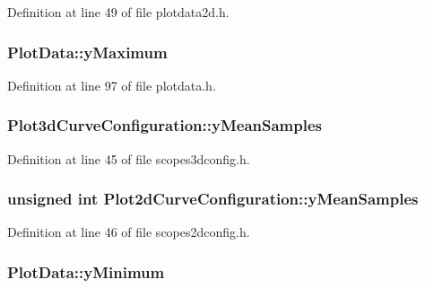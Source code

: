 Definition at line 49 of file plotdata2d.\-h.

\hypertarget{group___scope_plugin_gaf9ae404a5b9a749189b4cba112eb5c18}{
\subsubsection[{y\-Maximum}]{ Plot\-Data\-::y\-Maximum\hspace{0.3cm}{\ttfamily [protected]}}}\label{group___scope_plugin_gaf9ae404a5b9a749189b4cba112eb5c18}


Definition at line 97 of file plotdata.\-h.

\hypertarget{group___scope_plugin_ga917daaa3cc944ff8bd9e8ae6ed1cfc3b}{
\subsubsection[{y\-Mean\-Samples}]{ Plot3d\-Curve\-Configuration\-::y\-Mean\-Samples}}\label{group___scope_plugin_ga917daaa3cc944ff8bd9e8ae6ed1cfc3b}


Definition at line 45 of file scopes3dconfig.\-h.

\hypertarget{group___scope_plugin_gabe6fab440d33b0a9cb4ad4db2950c26d}{
\subsubsection[{y\-Mean\-Samples}]{\setlength{\rightskip}{0pt plus 5cm}unsigned {\bf int} Plot2d\-Curve\-Configuration\-::y\-Mean\-Samples}}\label{group___scope_plugin_gabe6fab440d33b0a9cb4ad4db2950c26d}


Definition at line 46 of file scopes2dconfig.\-h.

\hypertarget{group___scope_plugin_gabb9422e4f6ced646443b98b6b4304957}{
\subsubsection[{y\-Minimum}]{ Plot\-Data\-::y\-Minimum\hspace{0.3cm}{\ttfamily [protected]}}}\label{group___scope_plugin_gabb9422e4f6ced646443b98b6b4304957}


